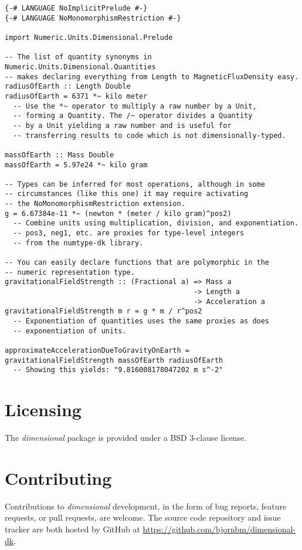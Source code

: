 \documentclass[11pt]{report}
\newcommand{\packagename}[1]{\textit{#1}}
\newcommand{\thispackage}{\packagename{dimensional}}
\begin{document}
\begin{lstlisting}
{-# LANGUAGE NoImplicitPrelude #-}
{-# LANGUAGE NoMonomorphismRestriction #-}

import Numeric.Units.Dimensional.Prelude

-- The list of quantity synonyms in Numeric.Units.Dimensional.Quantities
-- makes declaring everything from Length to MagneticFluxDensity easy.
radiusOfEarth :: Length Double
radiusOfEarth = 6371 *~ kilo meter
  -- Use the *~ operator to multiply a raw number by a Unit, 
  -- forming a Quantity. The /~ operator divides a Quantity
  -- by a Unit yielding a raw number and is useful for
  -- transferring results to code which is not dimensionally-typed.

massOfEarth :: Mass Double
massOfEarth = 5.97e24 *~ kilo gram

-- Types can be inferred for most operations, although in some
-- circumstances (like this one) it may require activating
-- the NoMonomorphismRestriction extension.
g = 6.67384e-11 *~ (newton * (meter / kilo gram)^pos2)
  -- Combine units using multiplication, division, and exponentiation.
  -- pos3, neg1, etc. are proxies for type-level integers
  -- from the numtype-dk library.

-- You can easily declare functions that are polymorphic in the
-- numeric representation type.
gravitationalFieldStrength :: (Fractional a) => Mass a 
                                             -> Length a
                                             -> Acceleration a
gravitationalFieldStrength m r = g * m / r^pos2
  -- Exponentiation of quantities uses the same proxies as does
  -- exponentiation of units.

approximateAccelerationDueToGravityOnEarth = gravitationalFieldStrength massOfEarth radiusOfEarth
  -- Showing this yields: "9.816008178047202 m s^-2"
\end{lstlisting}

\section{Licensing}

The \thispackage{} package is provided under a BSD 3-clause license.

\section{Contributing}

Contributions to \thispackage{} development, in the form of bug reports,
feature requests, or pull requests, are welcome. The source code repository and issue
tracker are both hosted by GitHub at \url{https://github.com/bjornbm/dimensional-dk}.
\end{document}
